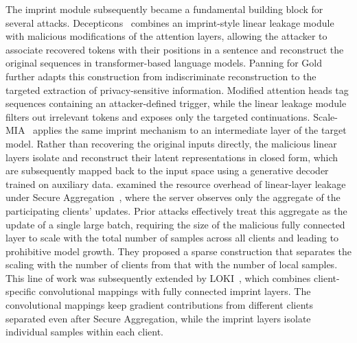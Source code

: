 The imprint module subsequently became a fundamental building block for several attacks. Decepticons~\cite{fowlDecepticonsCorruptedTransformers2022} combines an
imprint-style linear leakage module with malicious modifications of the
attention layers, allowing the attacker to associate recovered
tokens with their positions in a sentence and reconstruct the original sequences in
transformer-based language models.
Panning for Gold~\cite{chu2023panning} further adapts this construction
from indiscriminate reconstruction to the targeted extraction of
privacy-sensitive information. Modified attention heads tag sequences
containing an attacker-defined trigger, while the linear leakage module
filters out irrelevant tokens and exposes only the targeted
continuations. Scale-MIA~\cite{shiScaleMIAScalableModel2025} applies the same imprint
mechanism to an intermediate layer of the target model. Rather than
recovering the original inputs directly, the malicious linear layers
isolate and reconstruct their latent representations in closed form,
which are subsequently mapped back to the input space using a
generative decoder trained on auxiliary data.
 examined the resource overhead of linear-layer leakage under Secure Aggregation~\cite{secure_aggregation_bonawitz}, where the server observes only the aggregate of the participating clients' updates. Prior attacks effectively treat this aggregate as the update of a single large batch, requiring the size of the malicious fully connected layer to scale with the total number of samples across all clients and leading to prohibitive model growth. They proposed a sparse construction that separates the scaling with the number of clients from that with the number of local samples. This line of work was subsequently extended by LOKI~\cite{zhaoLOKILargescaleData2023a}, which combines client-specific convolutional mappings with fully connected imprint layers. The convolutional mappings keep gradient contributions from different clients separated even after Secure Aggregation, while the imprint layers isolate individual samples within each client.

